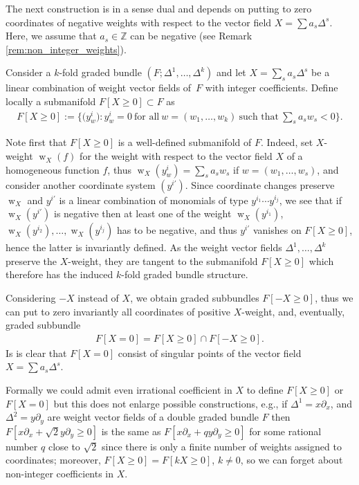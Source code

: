 \documentclass[10pt,a4paper]{amsart}
\DeclareMathOperator{\w}{w}
\newcommand{\Zet}{{\mathbb Z}}
\newcommand{\pa}{\partial}
\numberwithin{equation}{section}
\begin{document}
The next construction is in a sense dual and depends on putting to zero coordinates of negative weights with respect to the vector f\/ield $X=\sum a_s \Delta^s$. Here, we assume that $a_s\in \Zet$ can be negative (see Remark \ref{rem:non_integer_weights}).
\begin{Definition}\label{def:removal_coordinates2} Consider a $k$-fold graded bundle $(F; \Delta^1, \ldots, \Delta^k)$ and let $X=\sum_s a_s \Delta^s$ be a linear combination of weight vector f\/ields of~$F$ with integer coef\/f\/icients. Def\/ine locally a submanifold $F[X\geq 0] \subset F$ as
\begin{gather*}
 F[X\geq 0]:= \bigg\{\big(y^i_w\big)\colon y^i_w=0 \  \text{for all} \  w=(w_1, \ldots, w_k)\  \text{such that}\  \sum_s a_s w_s < 0\bigg\}.
\end{gather*}
\end{Definition}

Note f\/irst that $F[X\geq 0]$ is a well-def\/ined submanifold of $F$. Indeed, set $X$-weight $\w_X(f)$ for the weight with respect to the vector f\/ield $X$ of a homogeneous function $f$, thus $\w_X(y^i_w) = \sum_s a_s w_s$ if $w=(w_1, \ldots, w_s)$, and consider another coordinate system $(y^{i'})$. Since coordinate changes preserve $\w_X$ and $y^{i'}$ is a linear combination of monomials of type $y^{i_1}\cdots y^{i_j}$, we see that if $\w_X(y^{i'})$ is negative then at least one of the weight $\w_X(y^{i_1})$, $\w_X(y^{i_2}), \ldots, \w_X(y^{i_j})$ has to be negative, and thus $y^{i'}$ vanishes on $F[X\geq 0]$, hence the latter is invariantly def\/ined. As the weight vector f\/ields $\Delta^1, \ldots, \Delta^k$ preserve the $X$-weight, they are tangent to the submanifold $F[X\geq 0]$ which therefore has the induced $k$-fold graded bundle structure.

Considering $-X$ instead of $X$, we obtain graded subbundles $F[-X\ge 0]$, thus we can put to zero invariantly all coordinates of positive $X$-weight, and, eventually, graded subbundle \begin{gather*}
F[X=0] = F[X\geq 0] \cap F[-X\geq 0].
\end{gather*}
Is is clear that $F[X=0]$ consist of singular points of the vector f\/ield $X = \sum a_s \Delta^s$.

\begin{Remark}\label{rem:non_integer_weights} Formally we could admit even irrational coef\/f\/icient in $X$ to def\/ine $F[X\geq 0]$ or $F[X=0]$ but this does not enlarge possible constructions, e.g., if $\Delta^1 = x \pa_x$, and $\Delta^2 = y\pa_y$ are weight vector f\/ields of a double graded bundle $F$ then $F[x\pa_x + \sqrt{2} y \pa_y\geq 0]$ is the same as $F[x\pa_x + q y \pa_y\geq 0]$ for some rational number $q$ close to $\sqrt{2}$ since there is only a f\/inite number of weights assigned to coordinates; moreover, $F[X\geq 0] = F[k X\geq 0]$, $k\neq 0$, so we can forget about non-integer coef\/f\/icients in $X$.
\end{Remark}
\end{document}
